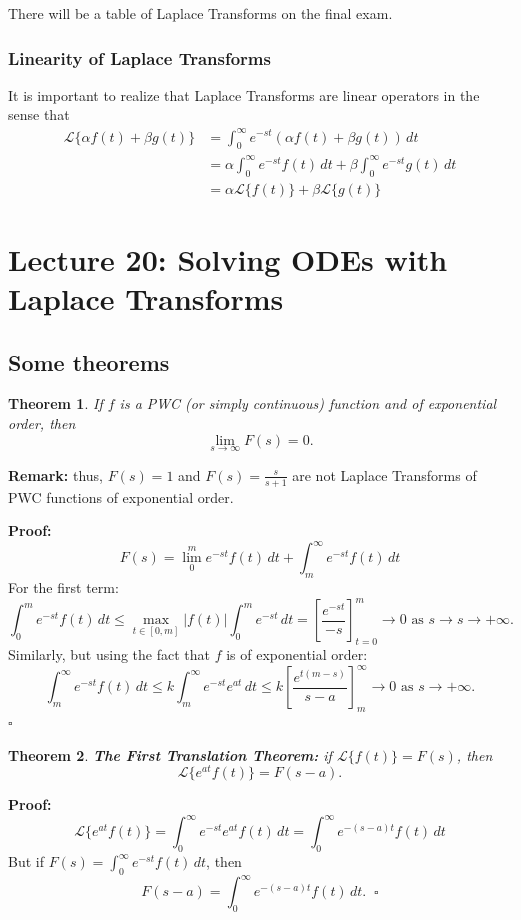 \documentclass[11pt]{article}
\newtheorem{thm}{Theorem}[section]
\newcommand{\lap}{\mathcal{L}}
\newcommand{\intzi}{\int_0^{\infty}}
\newcommand{\lapft}{\lap\{f(t)\}}
\begin{document}
	There will be a table of Laplace Transforms on the final exam.

\subsubsection{Linearity of Laplace Transforms}
	It is important to realize that Laplace Transforms are linear operators in the sense that
		\begin{align*}
			\lap\{ \alpha f(t) + \beta g(t)\} &= \intzi e^{-st} (\alpha f(t) + \beta g(t))\,dt \\
				&= \alpha \intzi e^{-st} f(t) \,dt + \beta \intzi e^{-st} g(t) \,dt \\
				&= \alpha \lap\{f(t)\} + \beta \lap\{g(t)\}
		\end{align*}

\section{Lecture 20: Solving ODEs with Laplace Transforms}
\subsection{Some theorems}
	\begin{thm}
		If $f$ is a PWC (or simply continuous) function and of exponential order, then
			$$ \lim_{s \to \infty} F(s) = 0. $$
	\end{thm}

	\textbf{Remark:} thus, $F(s) = 1$ and $F(s) = \frac{s}{s+1}$ are not Laplace Transforms of PWC functions of exponential order.

	\textbf{Proof:}
		$$ F(s) = \lim_0^m e^{-st} f(t) \,dt + \int_m^{\infty} e^{-st} f(t) \,dt $$
	For the first term:
		$$ \int_0^m e^{-st} f(t) \,dt \leq \max_{t \in [0,m]} |f(t)| \int_0^m e^{-st} \,dt = \left[\frac{e^{-st}}{-s} \right]_{t=0}^m \to 0 \text{ as } s \to s \to + \infty .$$
	Similarly, but using the fact that $f$ is of exponential order:
		$$ \int_m^{\infty} e^{-st} f(t) \,dt \leq k \int_m^{\infty} e^{-st} e^{at} \,dt \leq k \left[ \frac{e^{t(m-s)}}{s-a}\right]_m^{\infty} \to 0 \text{ as } s \to + \infty . $$
	$\square$

	\begin{thm}
		\textbf{The First Translation Theorem:} if $\lapft = F(s)$, then
			$$ \lap\{e^{at} f(t)\} = F(s-a). $$
	\end{thm}
	\textbf{Proof:}
		$$ \lap\{e^{at} f(t)\} = \intzi e^{-st} e^{at} f(t) \, dt = \intzi e^{-(s-a)t} f(t) \,dt $$
	But if $F(s) = \intzi e^{-st} f(t) \,dt$, then
		$$ F(s-a) = \intzi e^{-(s-a)t} f(t) \,dt . \; \; \square$$
\end{document}
